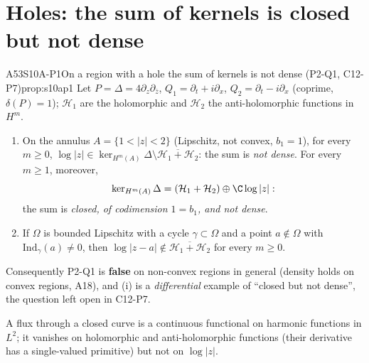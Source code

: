 \section{Holes: the sum of kernels is closed but not dense}

\begin{dimcard}{A53}{S10A-P1}{On a region with a hole the sum of kernels is not dense (P2-Q1, C12-P7)}{\proved}{prop:s10ap1}
Let $P=\Delta=4\partial_z\partial_{\bar z}$, $Q_1=\partial_t+i\partial_x$, $Q_2=\partial_t-i\partial_x$ (coprime, $\delta(P)=1$); $\mathcal H_1$ are the holomorphic and $\mathcal H_2$ the anti-holomorphic functions in $H^m$.
\begin{enumerate}[label=(\roman*)]
\item On the annulus $A=\{1<|z|<2\}$ (Lipschitz, not convex, $b_1=1$), for every $m\ge0$, $\log|z|\in\ker_{H^m(A)}\Delta\setminus\overline{\mathcal H_1+\mathcal H_2}$: the sum is \emph{not dense}. For every $m\ge1$, moreover,
\[
\ker_{H^m(A)}\Delta=(\mathcal H_1+\mathcal H_2)\oplus\C\log|z| :
\]
the sum is \emph{closed, of codimension $1=b_1$, and not dense}.
\item If $\Omega$ is bounded Lipschitz with a cycle $\gamma\subset\Omega$ and a point $a\notin\Omega$ with $\mathrm{Ind}_\gamma(a)\ne0$, then $\log|z-a|\notin\overline{\mathcal H_1+\mathcal H_2}$ for every $m\ge0$.
\end{enumerate}
Consequently P2-Q1 is \textbf{false} on non-convex regions in general (density holds on convex regions, A18), and (i) is a \emph{differential} example of ``closed but not dense'', the question left open in C12-P7.
\end{dimcard}

\begin{proofidea}
A flux through a closed curve is a continuous functional on harmonic functions in $L^2$; it vanishes on holomorphic and anti-holomorphic functions (their derivative has a single-valued primitive) but not on $\log|z|$.
\end{proofidea}

